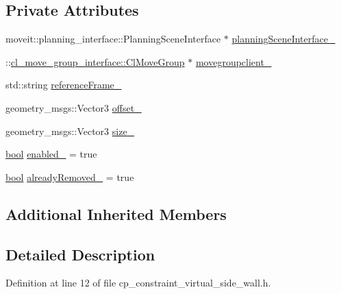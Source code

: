 \subsection*{Private Attributes}
\begin{DoxyCompactItemize}
\item 
moveit\+::planning\+\_\+interface\+::\+Planning\+Scene\+Interface $\ast$ \hyperlink{classsm__moveit__screw__loop_1_1cl__move__group__interface_1_1CpConstraintVirtualSideWall_a457d54c11f9b78f4b411f52964c46151}{planning\+Scene\+Interface\+\_\+}
\item 
\+::\hyperlink{classcl__move__group__interface_1_1ClMoveGroup}{cl\+\_\+move\+\_\+group\+\_\+interface\+::\+Cl\+Move\+Group} $\ast$ \hyperlink{classsm__moveit__screw__loop_1_1cl__move__group__interface_1_1CpConstraintVirtualSideWall_a1de1c90ad714b588914a7c6543c6c788}{movegroupclient\+\_\+}
\item 
std\+::string \hyperlink{classsm__moveit__screw__loop_1_1cl__move__group__interface_1_1CpConstraintVirtualSideWall_a26e5b811c2b96eff63de1a0e8f6d7123}{reference\+Frame\+\_\+}
\item 
geometry\+\_\+msgs\+::\+Vector3 \hyperlink{classsm__moveit__screw__loop_1_1cl__move__group__interface_1_1CpConstraintVirtualSideWall_a3ba336712454339510d0fb6804ff2a16}{offset\+\_\+}
\item 
geometry\+\_\+msgs\+::\+Vector3 \hyperlink{classsm__moveit__screw__loop_1_1cl__move__group__interface_1_1CpConstraintVirtualSideWall_a8426348ea8e4b58a66677f971355a87b}{size\+\_\+}
\item 
\hyperlink{classbool}{bool} \hyperlink{classsm__moveit__screw__loop_1_1cl__move__group__interface_1_1CpConstraintVirtualSideWall_a3ad858929f75175c5c7955b76bb095ec}{enabled\+\_\+} = true
\item 
\hyperlink{classbool}{bool} \hyperlink{classsm__moveit__screw__loop_1_1cl__move__group__interface_1_1CpConstraintVirtualSideWall_a5a48090196dffd58a81f2d6cf77e2405}{already\+Removed\+\_\+} = true
\end{DoxyCompactItemize}
\subsection*{Additional Inherited Members}


\subsection{Detailed Description}


Definition at line 12 of file cp\+\_\+constraint\+\_\+virtual\+\_\+side\+\_\+wall.\+h.



